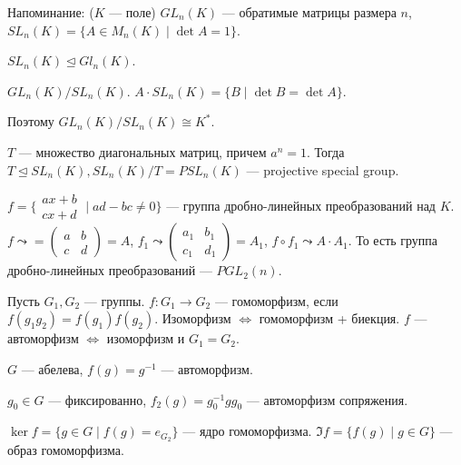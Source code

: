 Напоминание: ($K$ --- поле) $GL_n(K)$ --- обратимые матрицы размера  $n$,  $SL_n(K) = \{ A \in M_n(K) \mid \det A = 1\}$. 

\begin{statement}
    $SL_n(K) \trianglelefteq Gl_n(K)$. 

     $GL_n(K) / SL_n(K)$.  $A \cdot SL_n(K) = \{B \mid \det B = \det A \}$.

     Поэтому  $GL_n(K) / SL_n(K) \cong K^*$.
\end{statement}

\begin{statement}
    $T$ --- множество диагональных матриц, причем  $a^n = 1$. Тогда  $T \trianglelefteq SL_n(K), SL_n(K) / T = PSL_n(K)$ --- projective special group.
\end{statement}
\begin{example}
    $f = \{ \begin{array}{l} ax + b \\ cx + d \end{array} \mid ad - bc \neq 0 \}$ --- группа дробно-линейных преобразований над $K$. $f \leadsto = \begin{pmatrix} a & b \\ c & d \end{pmatrix} = A$,  $f_1 \leadsto \begin{pmatrix} a_1 & b_1 \\ c_1 & d_1 \end{pmatrix} = A_1$, $f \circ f_1 \leadsto A \cdot A_1$. То есть группа дробно-линейных преобразований ---   $PGL_2(n)$.
\end{example}
Пусть $G_1, G_2$ --- группы. $f\!: G_1 \to G_2$ --- гомоморфизм, если $f(g_1g_2) = f(g_1)f(g_2)$. Изоморфизм $\iff$ гомоморфизм + биекция.  $f$ --- автоморфизм  $\iff$ изоморфизм и  $G_1 = G_2$.
\begin{remark}
    $G$ --- абелева,  $f(g) = g^{-1}$ --- автоморфизм.

     $g_0 \in G$ --- фиксированно, $f_2(g) = g_0^{-1}gg_0$ --- автоморфизм сопряжения.
\end{remark}

$\ker f = \{g \in G \mid f(g) = e_{G_2}\}$ --- ядро гомоморфизма.  $\Im f = \{ f(g) \mid g \in G \}$ --- образ гомоморфизма.

